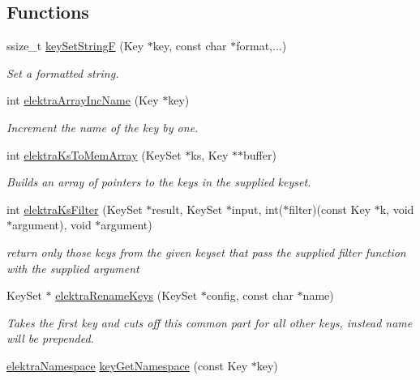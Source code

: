\subsection*{Functions}
\begin{DoxyCompactItemize}
\item 
ssize\+\_\+t \hyperlink{group__api_ga812eb6c4f506dafa5733bf531c52199c}{key\+Set\+String\+F} (Key $\ast$key, const char $\ast$format,...)
\begin{DoxyCompactList}\small\item\em Set a formatted string. \end{DoxyCompactList}\item 
int \hyperlink{group__api_gafc46476b8d722d89e07a966e023df317}{elektra\+Array\+Inc\+Name} (Key $\ast$key)
\begin{DoxyCompactList}\small\item\em Increment the name of the key by one. \end{DoxyCompactList}\item 
int \hyperlink{group__api_gac3e995819383f904369c260f212125f5}{elektra\+Ks\+To\+Mem\+Array} (Key\+Set $\ast$ks, Key $\ast$$\ast$buffer)
\begin{DoxyCompactList}\small\item\em Builds an array of pointers to the keys in the supplied keyset. \end{DoxyCompactList}\item 
int \hyperlink{group__api_ga5e727c6d8197f5871a2075454b6214f2}{elektra\+Ks\+Filter} (Key\+Set $\ast$result, Key\+Set $\ast$input, int($\ast$filter)(const Key $\ast$k, void $\ast$argument), void $\ast$argument)
\begin{DoxyCompactList}\small\item\em return only those keys from the given keyset that pass the supplied filter function with the supplied argument \end{DoxyCompactList}\item 
Key\+Set $\ast$ \hyperlink{group__api_gab436b020c8292d4c40ea2b27dc70305d}{elektra\+Rename\+Keys} (Key\+Set $\ast$config, const char $\ast$name)
\begin{DoxyCompactList}\small\item\em Takes the first key and cuts off this common part for all other keys, instead name will be prepended. \end{DoxyCompactList}\item 
\hyperlink{group__proposal_gaec3b8d6f430ae49b91bafe8a86310a68}{elektra\+Namespace} \hyperlink{group__api_gafc3ca03ed10f87eb59bdc02cf2a0de8d}{key\+Get\+Namespace} (const Key $\ast$key)
$$
\end{DoxyCompactItemize}

